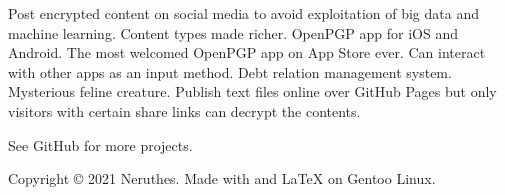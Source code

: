     \hfill
    \begin{minipage}[t]{50mm}
        \raggedright


            {Post encrypted content on social media to avoid exploitation of big data and machine learning.
            Content types made richer.}
            {OpenPGP app for iOS and Android. The most welcomed OpenPGP app on App Store ever.
            Can interact with other apps as an input method.}
            {Debt relation management system.}
            {Mysterious feline creature.}
            {Publish text files online over GitHub Pages but only visitors with certain share links can decrypt the contents.}
        
        \vspace{25pt}
        
        \footnotesize
        See GitHub for more projects.
    \end{minipage}










    \vfill

    \begin{minipage}[t]{\textwidth}
        \footnotesize

        Copyright {\copyright} 2021 Neruthes.
        Made with  and {\LaTeX} on Gentoo Linux.
    \end{minipage}









